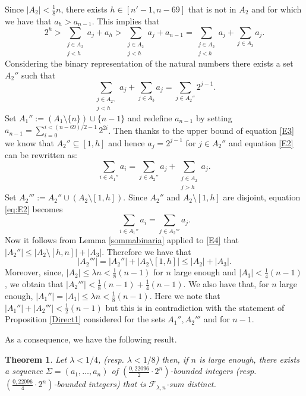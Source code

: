 \documentclass[a4paper]{amsart}
\theoremstyle{plain}
\newtheorem{Theorem}[Definition]{Theorem}
\begin{document}
Since $|A_2|<\frac{1}{8}n$,  there exists $h\in [n'-1,n-69]$ that is not in $A_2$ and for which we have that $a_{h} > a_{n-1}$. This implies that 
\begin{equation}\label{E3}
2^{h} > \sum_{\substack{j\in A_2 \\ j <h}} a_j+a_{h} >  \sum_{\substack{j\in A_2\\ j <h}}a_j+ a_{n-1} = \sum_{\substack{j\in A_2\\ j <h}}a_j + \sum_{j \in A_3} a_{j}.
\end{equation} 
Considering the binary representation of the natural numbers  there exists a set $A_2''$ such that
\begin{equation}\label{E4}
\sum_{\substack{j\in A_2, \\ j <h}}a_j + \sum_{j \in A_3} a_{j} = \sum_{j\in A_2''} 2^{j-1}.
\end{equation}
Set $A_1'':= (A_1\setminus \{n\}) \cup \{n-1\}$ and redefine $a_{n-1}$ by setting $a_{n-1} = \sum_{i=0}^{i<(n-69)/2-1} 2^{2i}$. Then thanks to the upper bound of equation \eqref{E3} we know that $A_2'' \subseteq [1, h]$ and hence $a_j = 2^{j-1}$ for $j \in A_2''$ and equation \eqref{E2} can be rewritten as:
\begin{equation}\label{eq:E2}
	\sum_{i\in A_1''} a_i=\sum_{j\in A_2''} a_j + \sum_{\substack{j\in A_2 \\ j > h}} a_j.
\end{equation}
Set $A_2''' := A_2'' \cup (A_2 \setminus [1,h])$.  Since $A_2''$ and $A_2 \setminus [1,h]$ are disjoint,  equation \eqref{eq:E2} becomes
$$
	\sum_{i\in A_1''} a_i=\sum_{j\in A_2'''} a_j.
$$
Now it follows from Lemma \ref{sommabinaria} applied to \eqref{E4} that $|A_2''| \leq |A_2 \setminus [h, n]| + |A_3|$.  Therefore we have that
$$
	|A_2'''| = |A_2''| + |A_2 \setminus [1,h]| \leq |A_2| + |A_3|. 
$$
Moreover, since,  $|A_2|\leq \lambda n<\frac{1}{8}(n-1)$ for $n$ large enough and $|A_3| < \frac{1}{4}(n-1)$,  we obtain that $|A_2'''| <\frac{1}{8}(n-1)+\frac{1}{4}(n-1)$. We also have that, for $n$ large enough, $|A_1''| = |A_1| \leq \lambda n <\frac{1}{8}(n-1)$. Here we note that $|A_1''|+|A_2'''|<\frac{1}{2}(n-1)$ but this is in contradiction with the statement of Proposition \ref{Direct1} considered for the sets $A_1'', A_2'''$ and for $n-1$.
\endproof

As a consequence, we have the following result.
\begin{Theorem}\label{Direct2}
Let $\lambda<1/4$, (resp. $\lambda<1/8$) then, if $n$ is large enough, there exists a sequence $\Sigma=(a_1,\dots,a_n)$ of $\left(\frac{0,22096}{2} \cdot 2^{n}\right)$-bounded integers (resp. $\left(\frac{0,22096}{4} \cdot 2^{n}\right)$-bounded integers) that is $\mathcal{F}_{\lambda,n}$-sum distinct.
\end{Theorem}
\end{document}

